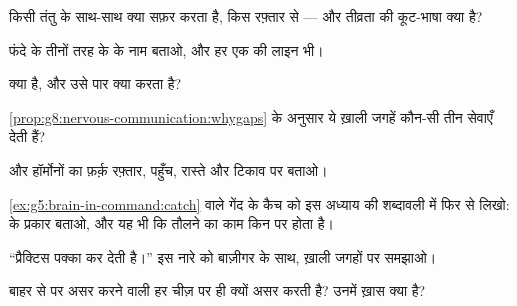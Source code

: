 \begin{exercise}[$\star$]\label{exo:g8:nervous-communication:2}
किसी तंतु के साथ-साथ क्या सफ़र करता है, किस रफ़्तार से --- और तीव्रता की
कूट-भाषा क्या है?
\end{exercise}

\begin{exercise}[$\star$]\label{exo:g8:nervous-communication:3}
फंदे के तीनों तरह के  के नाम बताओ, और हर एक की लाइन भी।
\end{exercise}

\begin{exercise}[$\star$]\label{exo:g8:nervous-communication:4}
 क्या है, और उसे पार क्या करता है?
\end{exercise}

\begin{exercise}[$\star$]\label{exo:g8:nervous-communication:5}
\cref{prop:g8:nervous-communication:whygaps} के अनुसार ये ख़ाली जगहें
कौन-सी तीन सेवाएँ देती हैं?
\end{exercise}

\begin{exercise}[$\star$]\label{exo:g8:nervous-communication:6}
 और हॉर्मोनों का फ़र्क़ रफ़्तार, पहुँच, रास्ते और टिकाव पर
बताओ।
\end{exercise}

\begin{exercise}[$\star\star$]\label{exo:g8:nervous-communication:7}
\cref{ex:g5:brain-in-command:catch} वाले गेंद के कैच को इस अध्याय की
शब्दावली में फिर से लिखो:  के प्रकार बताओ, और यह भी कि तौलने का
काम किन  पर होता है।
\end{exercise}

\begin{exercise}[$\star\star$]\label{exo:g8:nervous-communication:8}
``प्रैक्टिस पक्का कर देती है।'' इस नारे को बाज़ीगर के साथ, ख़ाली जगहों पर
समझाओ।
\end{exercise}

\begin{exercise}[$\star\star$]\label{exo:g8:nervous-communication:9}
बाहर से  पर असर करने वाली हर चीज़  पर ही
क्यों असर करती है? उनमें ख़ास क्या है?
\end{exercise}

